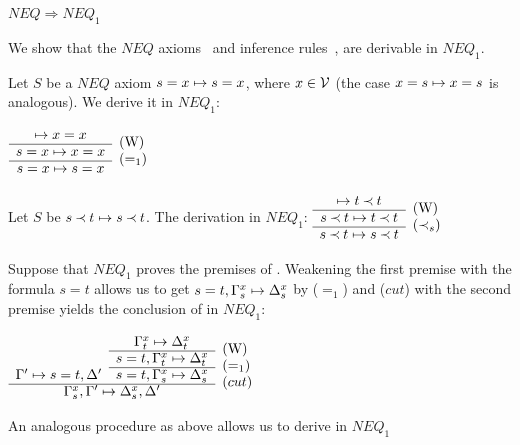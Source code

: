 \begin{LEMMA}\label{le:neqtoneq1} $NEQ \Rightarrow NEQ_1$ \end{LEMMA}
\begin{PROOF}
We show that the $NEQ$ axioms~ and inference rules~,
 are derivable in $NEQ_1$.
\begin{LS}\MyLPar
\item Let $S$ be a $NEQ$ axiom $s=x\mathrel{\mapsto} s=x$, where $x\in\mbox{$\cal V$}$ (the case
$x=s\mathrel{\mapsto} x=s$ is analogous). We derive it in $NEQ_1$:
\begin{center} \( \begin{array}{cl}
  \Seq x=x & \raisebox{-1.2ex}[1.5ex][0ex]{(W)} \\ \cline{1-1}
  s=x\Seq x=x & \raisebox{-1.2ex}[1.5ex][0ex]{($=_1$)} \\ \cline{1-1}
  s=x\Seq s=x
\end{array} \) \end{center}
\item Let $S$ be $s\mathbin{\prec} t\mathrel{\mapsto} s\mathbin{\prec} t$. The derivation in $NEQ_1$:
\( \begin{array}{cl}
  \Seq t\Incl t & \raisebox{-1.2ex}[1.5ex][0ex]{(W)} \\ \cline{1-1}
  s\Incl t\Seq t\Incl t & \raisebox{-1.2ex}[1.5ex][0ex]{($\Incl_s$)} \\ \cline{1-1}
  s\Incl t\Seq s\Incl t
\end{array} \)
\item Suppose that $NEQ_1$ proves the premises of . Weakening the
first premise with the formula $s=t$ allows us to get $s=t,\Gamma_s^x\mathrel{\mapsto}\Delta_s^x$ by
($=_1$) and ($cut$) with the second premise yields the conclusion of 
 in $NEQ_1$:
\begin{center} \( \begin{array}{ccl}
 & \Gamma_t^x\Seq\Delta_t^x & \raisebox{-1.2ex}[1.5ex][0ex]{(W)} \\ \cline{2-2}
 & s=t,\Gamma_t^x\Seq\Delta_t^x & \raisebox{-1.2ex}[1.5ex][0ex]{($=_1$)} 
      \\ \cline{2-2}
\Gamma'\Seq s=t,\Delta' & s=t,\Gamma_s^x\Seq\Delta_s^x 
   & \raisebox{-1.2ex}[1.5ex][0ex]{($cut$)} \\ \cline{1-2}
\multicolumn{2}{c}{\Gamma_s^x,\Gamma'\Seq\Delta_s^x,\Delta'}
\end{array} \) \end{center}
\item An analogous procedure as above allows us to derive  in $NEQ_1$
\end{LS}
\end{PROOF}

